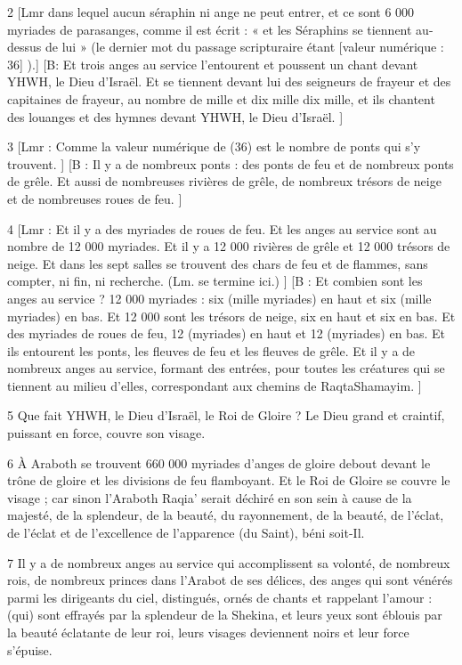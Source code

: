 \par 2 [Lmr dans lequel aucun séraphin ni ange ne peut entrer, et ce sont 6 000 myriades de parasanges, comme il est écrit : « et les Séraphins se tiennent au-dessus de lui » (le dernier mot du passage scripturaire étant [valeur numérique : 36] ).] [B: Et trois anges au service l'entourent et poussent un chant devant YHWH, le Dieu d'Israël. Et se tiennent devant lui des seigneurs de frayeur et des capitaines de frayeur, au nombre de mille et dix mille dix mille, et ils chantent des louanges et des hymnes devant YHWH, le Dieu d'Israël. ]

\par 3 [Lmr : Comme la valeur numérique de (36) est le nombre de ponts qui s'y trouvent. ] [B : Il y a de nombreux ponts : des ponts de feu et de nombreux ponts de grêle. Et aussi de nombreuses rivières de grêle, de nombreux trésors de neige et de nombreuses roues de feu. ]

\par 4 [Lmr : Et il y a des myriades de roues de feu. Et les anges au service sont au nombre de 12 000 myriades. Et il y a 12 000 rivières de grêle et 12 000 trésors de neige. Et dans les sept salles se trouvent des chars de feu et de flammes, sans compter, ni fin, ni recherche. (Lm. se termine ici.) ] [B : Et combien sont les anges au service ? 12 000 myriades : six (mille myriades) en haut et six (mille myriades) en bas. Et 12 000 sont les trésors de neige, six en haut et six en bas. Et des myriades de roues de feu, 12 (myriades) en haut et 12 (myriades) en bas. Et ils entourent les ponts, les fleuves de feu et les fleuves de grêle. Et il y a de nombreux anges au service, formant des entrées, pour toutes les créatures qui se tiennent au milieu d'elles, correspondant aux chemins de RaqtaShamayim. ]

\par 5 Que fait YHWH, le Dieu d'Israël, le Roi de Gloire ? Le Dieu grand et craintif, puissant en force, couvre son visage.

\par 6 À Araboth se trouvent 660 000 myriades d'anges de gloire debout devant le trône de gloire et les divisions de feu flamboyant. Et le Roi de Gloire se couvre le visage ; car sinon l'Araboth Raqia' serait déchiré en son sein à cause de la majesté, de la splendeur, de la beauté, du rayonnement, de la beauté, de l'éclat, de l'éclat et de l'excellence de l'apparence (du Saint), béni soit-Il.

\par 7 Il y a de nombreux anges au service qui accomplissent sa volonté, de nombreux rois, de nombreux princes dans l'Arabot de ses délices, des anges qui sont vénérés parmi les dirigeants du ciel, distingués, ornés de chants et rappelant l'amour : (qui) sont effrayés par la splendeur de la Shekina, et leurs yeux sont éblouis par la beauté éclatante de leur roi, leurs visages deviennent noirs et leur force s'épuise.


